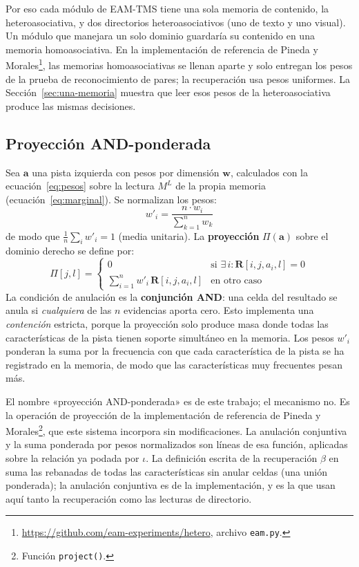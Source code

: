 Por eso cada módulo de EAM-TMS tiene una sola memoria de contenido, la
heteroasociativa, y dos directorios heteroasociativos (uno de texto y uno visual).
Un módulo que manejara un solo dominio guardaría su contenido en una memoria
homoasociativa.
En la implementación de referencia de Pineda y
Morales\footnote{\url{https://github.com/eam-experiments/hetero}, archivo \texttt{eam.py}.},
las memorias homoasociativas se llenan aparte y solo entregan los pesos de la prueba de
reconocimiento de pares; la recuperación usa pesos uniformes.
La Sección~\ref{sec:una-memoria} muestra que leer esos pesos de la heteroasociativa
produce las mismas decisiones.

\subsection*{Proyección AND-ponderada}

Sea $\mathbf{a}$ una pista izquierda con pesos por dimensión $\mathbf{w}$, calculados
con la ecuación~\eqref{eq:pesos} sobre la lectura $M^{L}$ de la propia memoria
(ecuación~\eqref{eq:marginal}).
Se normalizan los pesos:
\begin{equation}
    w'_i = \frac{n \cdot w_i}{\displaystyle\sum_{k=1}^{n} w_k}
    \label{eq:normalizacion-pesos}
\end{equation}
de modo que $\frac{1}{n}\sum_i w'_i = 1$ (media unitaria).
La \textbf{proyección} $\Pi(\mathbf{a})$ sobre el dominio derecho se define por:
\begin{equation}
    \Pi[j, l] = \begin{cases}
        0 & \text{si } \exists\, i : \mathbf{R}[i, j, a_i, l] = 0 \\[4pt]
        \displaystyle\sum_{i=1}^{n} w'_i\, \mathbf{R}[i, j, a_i, l] & \text{en otro caso}
    \end{cases}
    \label{eq:proyeccion-AND}
\end{equation}
La condición de anulación es la \textbf{conjunción AND}: una celda del resultado se
anula si \emph{cualquiera} de las $n$ evidencias aporta cero.
Esto implementa una \emph{contención} estricta, porque la proyección solo produce masa
donde todas las características de la pista tienen soporte simultáneo en la memoria.
Los pesos $w'_i$ ponderan la suma por la frecuencia con que cada característica de la
pista se ha registrado en la memoria, de modo que las características muy frecuentes
pesan más.

El nombre «proyección AND-ponderada» es de este trabajo; el mecanismo no.
Es la operación de proyección de la implementación de referencia de Pineda y
Morales\footnote{Función \texttt{project()}.}, que este sistema incorpora sin
modificaciones.
La anulación conjuntiva y la suma ponderada por pesos normalizados son líneas de esa
función, aplicadas sobre la relación ya podada por $\iota$.
La definición escrita de la recuperación $\beta$ en \cite{morales2025missing} suma las
rebanadas de todas las características sin anular celdas (una unión ponderada); la
anulación conjuntiva es de la implementación, y es la que usan aquí tanto la
recuperación como las lecturas de directorio.

